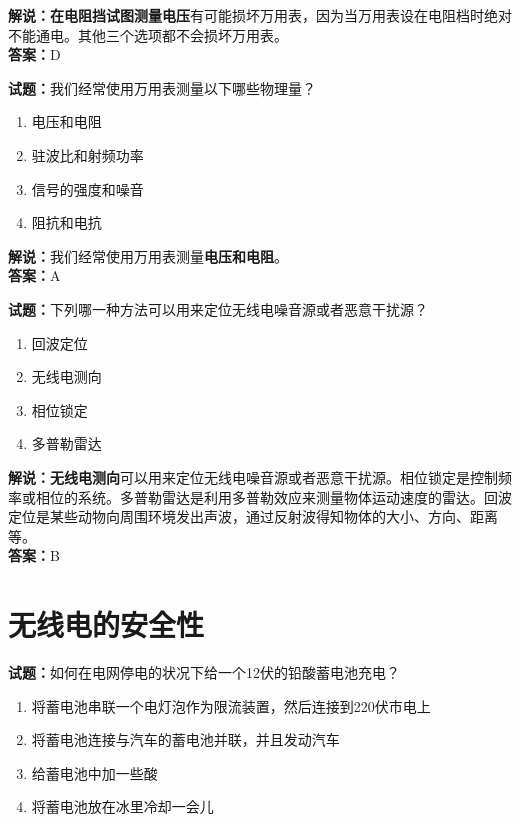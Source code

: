 \documentclass{ctexbook}
\begin{document}
\noindent\textbf{解说：在电阻挡试图测量电压}有可能损坏万用表，因为当万用表设在电阻档时绝对不能通电。其他三个选项都不会损坏万用表。\\\noindent\textbf{答案：}D


\bigskip


\noindent\textbf{试题：}我们经常使用万用表测量以下哪些物理量？

\begin{enumerate}[leftmargin=3em]
	\item 电压和电阻
	\item 驻波比和射频功率
	\item 信号的强度和噪音
	\item 阻抗和电抗
\end{enumerate}

\noindent\textbf{解说：}我们经常使用万用表测量\textbf{电压和电阻}。\\\noindent\textbf{答案：}A

\bigskip


\noindent\textbf{试题：}下列哪一种方法可以用来定位无线电噪音源或者恶意干扰源？

\begin{enumerate}[leftmargin=3em]
	\item 回波定位
	\item 无线电测向
	\item 相位锁定
	\item 多普勒雷达
\end{enumerate}

\noindent\textbf{解说：}\textbf{无线电测向}可以用来定位无线电噪音源或者恶意干扰源。相位锁定是控制频率或相位的系统。多普勒雷达是利用多普勒效应来测量物体运动速度的雷达。回波定位是某些动物向周围环境发出声波，通过反射波得知物体的大小、方向、距离等。\\\noindent\textbf{答案：}B%








\chapter{无线电的安全性}



\noindent\textbf{试题：}如何在电网停电的状况下给一个12伏的铅酸蓄电池充电？

\begin{enumerate}[leftmargin=3em]	
	\item 将蓄电池串联一个电灯泡作为限流装置，然后连接到220伏市电上
	\item 将蓄电池连接与汽车的蓄电池并联，并且发动汽车
	\item 给蓄电池中加一些酸
	\item 将蓄电池放在冰里冷却一会儿
\end{enumerate}
\end{document}
